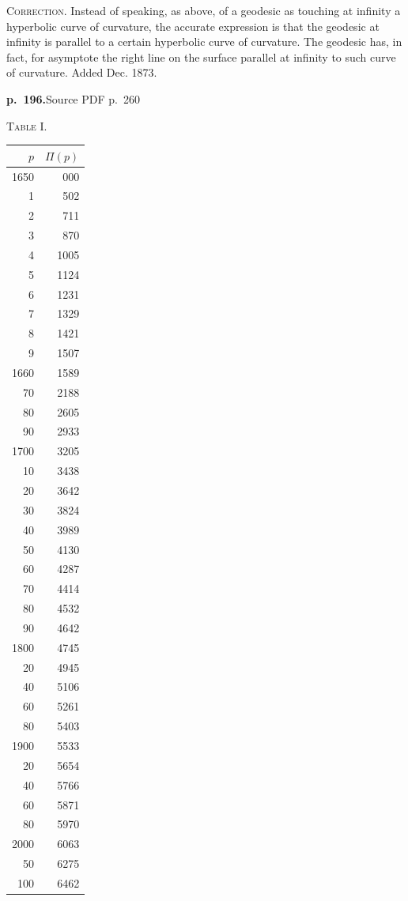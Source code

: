 \documentclass[11pt,a4paper]{article}
\newcommand{\sourcepage}[2]{\par\bigskip\noindent\textbf{p.~#1.}\hfill{\footnotesize Source PDF p.~#2}\par\nobreak\medskip}
\begin{document}
\textsc{Correction.} Instead of speaking, as above, of a geodesic as touching at infinity a hyperbolic curve of curvature, the accurate expression is that the geodesic at infinity is parallel to a certain hyperbolic curve of curvature. The geodesic has, in fact, for asymptote the right line on the surface parallel at infinity to such curve of curvature. Added Dec. 1873.

\sourcepage{196}{260}
\begin{center}
\begin{minipage}{0.42\linewidth}
\centering
\textsc{Table I.}\par
\begin{tabular}{rr}
\toprule
$p$&$\Pi(p)$\\
\midrule
1650&000\\
1&502\\
2&711\\
3&870\\
4&1005\\
5&1124\\
6&1231\\
7&1329\\
8&1421\\
9&1507\\
1660&1589\\
70&2188\\
80&2605\\
90&2933\\
1700&3205\\
10&3438\\
20&3642\\
30&3824\\
40&3989\\
50&4130\\
60&4287\\
70&4414\\
80&4532\\
90&4642\\
1800&4745\\
20&4945\\
40&5106\\
60&5261\\
80&5403\\
1900&5533\\
20&5654\\
40&5766\\
60&5871\\
80&5970\\
2000&6063\\
50&6275\\
100&6462\\

\end{tabular}
\end{minipage}
\end{center}
\end{document}
